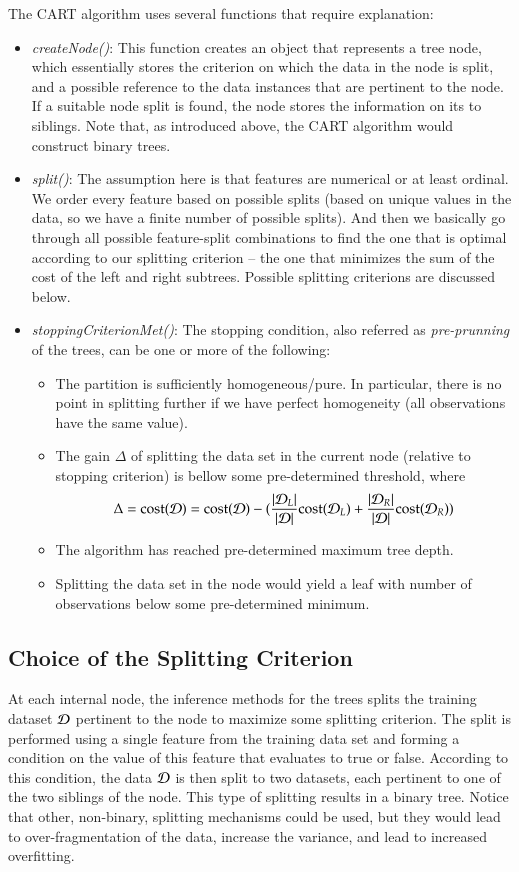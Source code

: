 \begin{refsection}
The CART algorithm uses several functions that require explanation:
\begin{itemize}
\item {\em createNode()}: This function creates an object that represents a tree node, which essentially stores the criterion on which the data in the node is split, and a possible reference to the data instances that are pertinent to the node. If a suitable node split is found, the node stores the information on its to siblings. Note that, as introduced above, the CART algorithm would construct binary trees.
\item {\em split()}: The assumption here is that features are numerical or at least ordinal. We order every feature based on possible splits (based on unique values in the data, so we have a finite number of possible splits). And then we basically go through all possible feature-split combinations to find the one that is optimal according to our splitting criterion -- the one that minimizes the sum of the cost of the left and right subtrees. Possible splitting criterions are discussed below.

\item {\em stoppingCriterionMet()}: The stopping condition, also referred as {\em pre-prunning} of the trees, can be one or more of the following:
\begin{itemize}
\item The partition is sufficiently homogeneous/pure. In particular, there is no point in splitting further if we have perfect homogeneity (all observations have the same value).
\item The gain $\Delta$ of splitting the data set in the current node (relative to stopping criterion) is bellow some pre-determined threshold, where
$$ \Delta = {\rm cost}(\mathcal{D}) = {\rm cost}(\mathcal{D})-({|\mathcal{D}_L|\over |\mathcal{D}|}{\rm cost}(\mathcal{D}_L) + {|\mathcal{D}_R|\over |\mathcal{D}|}{\rm cost}(\mathcal{D}_R))$$
\item The algorithm has reached pre-determined maximum tree depth.
\item Splitting the data set in the node would yield a leaf with number of observations below some pre-determined minimum.
\end{itemize}
\end{itemize}


\subsection*{Choice of the Splitting Criterion}

At each internal node, the inference methods for the trees splits the training dataset $\mathcal{D}$ pertinent to the node to maximize some splitting criterion. The split is performed using a single feature from the training data set and forming a condition on the value of this feature that evaluates to true or false. According to this condition, the data $\mathcal{D}$ is then split to two datasets, each pertinent to one of the two siblings of the node. This type of splitting results in a binary tree. Notice that other, non-binary, splitting mechanisms could be used, but they would lead to over-fragmentation of the data, increase the variance, and lead to increased overfitting.


\end{refsection}
